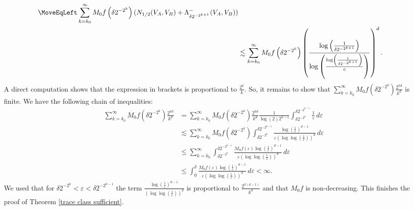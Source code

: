 \documentclass[12pt]{amsart}
\numberwithin{equation}{section}
\newcommand{\eps}{\varepsilon}
\begin{document}
\begin{align*}
\MoveEqLeft \sum_{k=k_0}^\infty M_0 f\left(\delta 2^{-2^k}\right)(N_{1/2}(V_A,V_B)+\Lambda^-_{\delta 2^{-2^{k+1}}}(V_A,V_B))\\
&\lesssim \sum_{k=k_0}^\infty M_0 f\left(\delta 2^{-2^k}\right) \left( \frac{\log\left(\tfrac{1}{\delta 2^{-2^{k+1}}}\right)}{\log \left(\tfrac{\log\left(\frac{1}{\delta 2^{-2^{k+1}}}\right)}{c}\right)}\right)^d.
\end{align*}
A direct computation shows that the expression in brackets is proportional to $\frac{2^k}{k}$. So, it remains to show that $\sum_{k=k_0}^\infty M_0 f\left(\delta 2^{-2^k}\right) \frac{2^{kd}}{k^d}$ is finite. We have the following chain of inequalities:
\begin{align*}
\sum_{k=k_0}^\infty M_0 f\left(\delta 2^{-2^k}\right) \frac{2^{kd}}{k^d} &= \sum_{k=k_0}^\infty M_0 f\left(\delta 2^{-2^k}\right) \frac{2^{kd}}{k^d}  \frac{1}{\log(2) 2^{k-1}} \int_{\delta 2^{-2^k}}^{\delta 2^{-2^{k-1}}} \frac{1}{\eps} \, d\eps\\
&\lesssim \sum_{k=k_0}^\infty  M_0 f\left(\delta 2^{-2^k}\right) \int_{\delta 2^{-2^k}}^{\delta 2^{-2^{k-1}}} \frac{\log\left(\frac{1}{\eps}\right)^{d-1}}{\eps\left(\log\log\left(\frac{1}{\eps}\right)\right)^d} \, d\eps\\
&\leq \sum_{k=k_0}^\infty \int_{\delta 2^{-2^k}}^{\delta 2^{-2^{k-1}}} \frac{M_0 f(\eps) \log\left(\frac{1}{\eps}\right)^{d-1}}{\eps\left(\log\log\left(\frac{1}{\eps}\right)\right)^d} \, d\eps\\
& \leq \int_0^{\delta} \frac{M_0 f(\eps) \log\left(\frac{1}{\eps}\right)^{d-1}}{\eps\left(\log\log\left(\frac{1}{\eps}\right)\right)^d} \, d\eps < \infty.
\end{align*}
We used that for $\delta 2^{-2^k} < \eps < \delta 2^{-2^{k-1}}$ the term $\frac{\log\left(\frac{1}{\eps}\right)^{d-1}}{\left(\log\log\left(\frac{1}{\eps}\right)\right)^d}$ is proportional to $\frac{2^{k(d-1)}}{k^d}$ and that $M_0 f$ is non-decreasing. This finishes the proof of Theorem \ref{trace class sufficient}.
\end{document}
